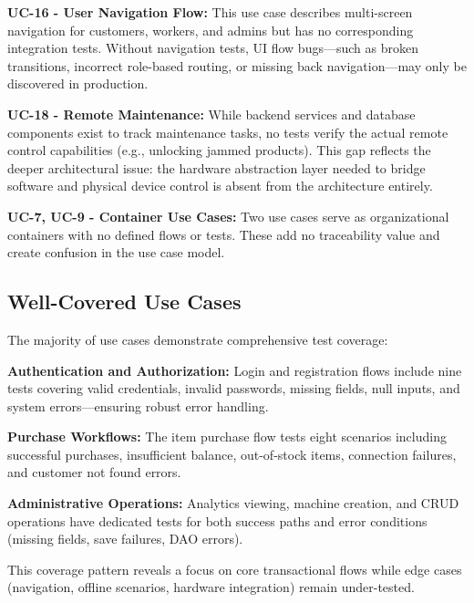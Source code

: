 \documentclass[11pt,a4paper]{article}
\begin{document}
\begin{tcolorbox}[colback=warningorange!5,colframe=warningorange,title=\textbf{Untested Use Cases}]
\textbf{\label{uc:navigation}UC-16 - User Navigation Flow:} This use case describes multi-screen navigation for customers, workers, and admins but has no corresponding integration tests. Without navigation tests, UI flow bugs—such as broken transitions, incorrect role-based routing, or missing back navigation—may only be discovered in production.

\textbf{\label{uc:remote-maintenance}UC-18 - Remote Maintenance:} While backend services and database components exist to track maintenance tasks, no tests verify the actual remote control capabilities (e.g., unlocking jammed products). This gap reflects the deeper architectural issue: the hardware abstraction layer needed to bridge software and physical device control is absent from the architecture entirely.

\textbf{\label{uc:containers}UC-7, UC-9 - Container Use Cases:} Two use cases serve as organizational containers with no defined flows or tests. These add no traceability value and create confusion in the use case model.
\end{tcolorbox}

\subsection{Well-Covered Use Cases}

The majority of use cases demonstrate comprehensive test coverage:

\textbf{Authentication and Authorization:} Login and registration flows include nine tests covering valid credentials, invalid passwords, missing fields, null inputs, and system errors—ensuring robust error handling.

\textbf{Purchase Workflows:} The item purchase flow tests eight scenarios including successful purchases, insufficient balance, out-of-stock items, connection failures, and customer not found errors.

\textbf{Administrative Operations:} Analytics viewing, machine creation, and CRUD operations have dedicated tests for both success paths and error conditions (missing fields, save failures, DAO errors).

This coverage pattern reveals a focus on core transactional flows while edge cases (navigation, offline scenarios, hardware integration) remain under-tested.

\end{document}
